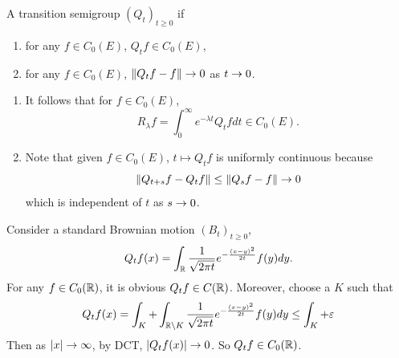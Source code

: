 \begin{defn}
    A transition semigroup $(Q_t)_{t \geq 0}$ if
    \begin{enumerate}[label=(\roman{*})]
        \item for any $f \in C_0(E)$, $Q_t f \in C_0(E)$,
        \item for any $f \in C_0(E)$, $\left\lVert Q_t f - f\right\lVert \rightarrow 0$ as $t \rightarrow 0$.
    \end{enumerate}
\end{defn}
\begin{rmk}
    \begin{enumerate}[label=(\roman*)]
        \item It follows that for $f \in C_0(E)$, 
        \begin{equation*}
            R_\lambda f = \int_0^\infty e^{-\lambda t}Q_t f dt \in C_0(E).
        \end{equation*}
        \item Note that given $f \in C_0(E)$, $t \mapsto Q_tf$ is uniformly continuous because
        \begin{equation*}
            \left\lVert Q_{t+s}f - Q_t f\right\lVert \leq \left\lVert Q_sf - f\right\lVert \rightarrow 0
        \end{equation*}
        which is independent of $t$ as $s \rightarrow 0$. 
    \end{enumerate}
\end{rmk}

\begin{exam}
    Consider a standard Brownian motion $(B_t)_{t \geq 0}$,
    \begin{equation*}
        Q_tf(x) = \int_{\mathbb{R}} \frac{1}{\sqrt{2\pi t}}e^{-\frac{(x-y)^2}{2t}}f(y)dy.
    \end{equation*}
    For any $f \in C_0(\mathbb{R})$, it is obvious $Q_tf \in C(\mathbb{R})$. Moreover, choose a $K$ such that
    \begin{equation*}
        Q_tf(x) = \int_K + \int_{\mathbb{R} \backslash K}\frac{1}{\sqrt{2\pi t}}e^{-\frac{(x-y)^2}{2t}}f(y)dy \leq \int_K + \varepsilon
    \end{equation*}
    Then as $\left\lvert x\right\lvert \rightarrow \infty$, by DCT, $\left\lvert Q_tf(x)\right\lvert \rightarrow 0$. So $Q_tf \in C_0(\mathbb{R})$. 
\end{exam}

